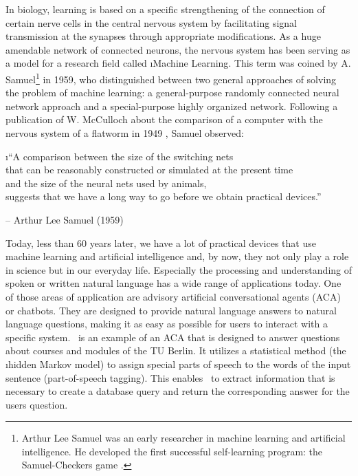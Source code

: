 In biology, learning is based on a specific strengthening of the connection of certain nerve cells in the central nervous system by facilitating signal transmission at the synapses through appropriate modifications. As a huge amendable network of connected neurons, the nervous system has been serving as a model for a research field called \i{Machine Learning}. This term was coined by A. Samuel\footnote{Arthur Lee Samuel was an early researcher in machine learning and artificial intelligence. He developed the first successful self-learning program: the Samuel-Checkers game \cite{samuel1959}.} \cite{samuel1959} in 1959, who distinguished between two general approaches of solving the problem of machine learning: a general-purpose randomly connected neural network approach and a special-purpose highly organized network. Following a publication of  W. McCulloch about the comparison of a computer with the nervous system of a flatworm in 1949 \cite{mcculloch1949}, Samuel observed:

\vspace{1em}
\i{``A comparison between the size of the switching nets\\that can be reasonably constructed or simulated at the present time\\and the size of the neural nets used by animals,\\suggests that we have a long way to go before we obtain practical devices.''}\\
\parbox{\textwidth}{\hfill \hfill -- Arthur Lee Samuel (1959)}
\vspace{.5em}

Today, less than 60 years later, we have a lot of practical devices that use machine learning and artificial intelligence and, by now, they not only play a role in science but in our everyday life. Especially the processing and understanding of spoken or written natural language has a wide range of applications today. One of those areas of application are advisory artificial conversational agents (ACA) or chatbots. They are designed to provide natural language answers to natural language questions, making it as easy as possible for users to interact with a specific system. \Alex\ is an example of an ACA that is designed to answer questions about courses and modules of the TU Berlin. It utilizes a statistical method (the \i{hidden Markov model}) to assign special parts of speech to the words of the input sentence (part-of-speech tagging). This enables \Alex\ to extract information that is necessary to create a database query and return the corresponding answer for the users question.

